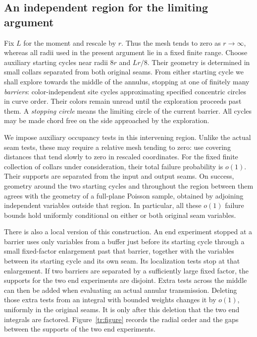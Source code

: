 \subsection{An independent region for the limiting argument}

Fix $L$ for the moment and rescale by $r$.  Thus the mesh tends to zero
as $r\to\infty$, whereas all radii used in the present argument lie in a
fixed finite range.  Choose auxiliary starting cycles near radii $8r$
and $Lr/8$.  Their geometry is determined in small collars separated
from both original seams.  From either starting cycle we shall explore
towards the middle of the annulus, stopping at one of finitely many
\emph{barriers}: color-independent site cycles approximating specified
concentric circles in curve order.  Their colors remain unread until
the exploration proceeds past them.  A \emph{stopping circle} means the
limiting circle of the current barrier.  All cycles may be
made chord free on the side approached by the exploration.

We impose auxiliary occupancy tests in this intervening region.  Unlike
the actual seam tests, these may require a relative mesh tending to
zero: use covering distances that tend slowly to zero in rescaled
coordinates.  For the fixed finite collection of collars under
consideration, their total failure probability is $o(1)$.  Their supports
are separated from the input and output seams.  On success, geometry
around the two starting cycles and throughout the region between them
agrees with the geometry of a full-plane Poisson sample, obtained by
adjoining independent variables outside that region.  In particular,
all these $o(1)$ failure bounds hold uniformly conditional on either or
both original seam variables.

There is also a local version of this construction.  An end experiment
stopped at a barrier uses only variables from a buffer just before its
starting cycle through a small fixed-factor enlargement past that
barrier, together with the variables between its starting cycle and its
own seam.  Its localization tests stop at that enlargement.  If two
barriers are separated by a sufficiently large fixed factor, the
supports for the two end experiments are disjoint.  Extra tests across
the middle can then be added when evaluating an actual annular
transmission.  Deleting those extra tests from an integral with bounded
weights changes it by $o(1)$, uniformly in the original seams.  It is
only after this deletion that the two end integrals are factored.
Figure~\ref{tr:figure} records the radial order and the gaps between
the supports of the two end experiments.

